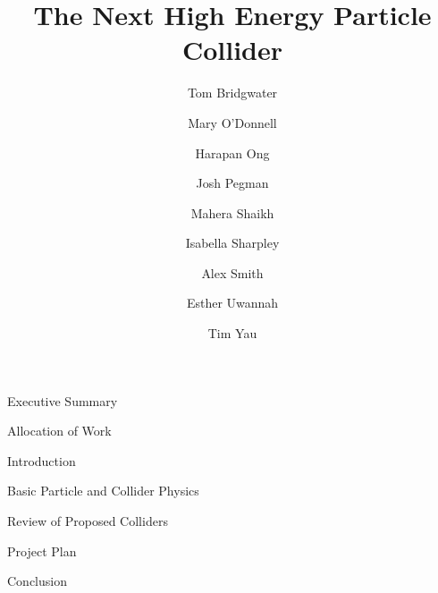 \documentclass[12pt]{article}
\begin{document}
    \begin{titlepage}
    
     \author{
         Tom Bridgwater \and
         Mary O'Donnell \and
         Harapan Ong \and
         Josh Pegman \and
         Mahera Shaikh \and
         Isabella Sharpley \and
         Alex Smith \and
         Esther Uwannah \and
         Tim Yau
     }
     
     \title{The Next High Energy Particle Collider}
     
     \maketitle
     
    
    \end{titlepage}
 
 \clearpage
 
 \setcounter{tocdepth}{2}
 \tableofcontents
 
 \clearpage
 
 \begin{section}{Executive Summary}
 	
 \end{section}
 
 \begin{section}{Allocation of Work}
 
 \end{section}
 
 \begin{section}{Introduction}
 
 \end{section}

 \begin{section}{Basic Particle and Collider Physics}
     
 \end{section}
 
 \begin{section}{Review of Proposed Colliders}
 
 \end{section}
 
 \begin{section}{Project Plan}
 
 \end{section}
 
 \begin{section}{Conclusion}
 
 \end{section}
 
 \clearpage
 
 
 
\end{document}
